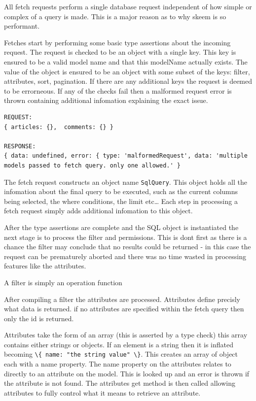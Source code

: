 \documentclass[
  12pt,
]{article}
\newcommand{\passthrough}[1]{#1}
\begin{document}
All fetch requests perform a single database request independent of how
simple or complex of a query is made. This is a major reason as to why
skeem is so performant.

Fetches start by performing some basic type assertions about the
incoming request. The request is checked to be an object with a single
key. This key is ensured to be a valid model name and that this
modelName actually exists. The value of the object is ensured to be an
object with some subset of the keys: filter, attributes, sort,
pagination. If there are any additional keys the request is deemed to be
errorneous. If any of the checks fail then a malformed request error is
thrown containing additional infomation explaining the exact issue.

\begin{lstlisting}[caption={A malformed request and the corrosponding response}]
REQUEST:
{ articles: {},  comments: {} }

RESPONSE:
{ data: undefined, error: { type: 'malformedRequest', data: 'multiple models passed to fetch query. only one allowed.' }
\end{lstlisting}

The fetch request constructs an object name
\passthrough{\lstinline!SqlQuery!}. This object holds all the infomation
about the final query to be executed, such as the current columns being
selected, the where conditions, the limit etc\ldots{} Each step in
processing a fetch request simply adds additional infomation to this
object.

After the type assertions are complete and the SQL object is
instantiated the next stage is to process the filter and permissions.
This is dont first as there is a chance the filter may conclude that no
results could be returned - in this case the request can be prematurely
aborted and there was no time wasted in processing features like the
attributes.

A filter is simply an operation function

After compiling a filter the attributes are processed. Attributes define
precisly what data is returned. if no attributes are specified within
the fetch query then only the id is returned.

Attributes take the form of an array (this is asserted by a type check)
this array contains either strings or objects. If an element is a string
then it is inflated becoming
\passthrough{\lstinline!\{ name: "the string value" \}!}. This creates
an array of object each with a name property. The name property on the
attributes relates to directly to an attribute on the model. This is
looked up and an error is thrown if the attribute is not found. The
attributes get method is then called allowing attributes to fully
control what it means to retrieve an attribute.
\end{document}
